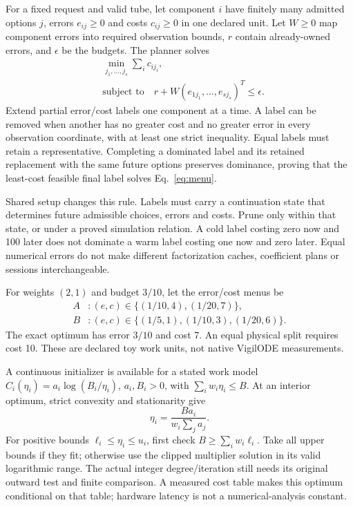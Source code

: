 \documentclass[aps,pra,reprint,onecolumn,10pt,notitlepage,nofootinbib]{revtex4-2}
\begin{document}
For a fixed request and valid tube, let component $i$ have finitely many
admitted options $j$, errors $e_{ij}\ge0$ and costs $c_{ij}\ge0$ in one
declared unit. Let $W\ge0$ map component errors into required observation
bounds, $r$ contain already-owned errors, and $\epsilon$ be the budgets.
The planner solves
\begin{equation}
 \begin{aligned}
 &\min_{j_1,\ldots,j_s}\sum_i c_{ij_i},\\
 &\text{subject to}\quad
 r+W(e_{1j_1},\ldots,e_{sj_s})^T\le\epsilon.
 \end{aligned}                                             \label{eq:menu}
\end{equation}
Extend partial error/cost labels one component at a time. A label can be
removed when another has no greater cost and no greater error in every
observation coordinate, with at least one strict inequality. Equal labels
must retain a representative. Completing a dominated label and its retained
replacement with the same future options preserves dominance, proving that
the least-cost feasible final label solves Eq.~\eqref{eq:menu}.

Shared setup changes this rule. Labels must carry a continuation state that
determines future admissible choices, errors and costs. Prune only within
that state, or under a proved simulation relation. A cold label costing zero
now and 100 later does not dominate a warm label costing one now and zero
later. Equal numerical errors do not make different factorization caches,
coefficient plans or sessions interchangeable.

For weights $(2,1)$ and budget $3/10$, let the error/cost menus be
\[
 \begin{aligned}
 A &: (e,c)\in\{(1/10,4),(1/20,7)\},\\
 B &: (e,c)\in\{(1/5,1),(1/10,3),(1/20,6)\}.
 \end{aligned}
\]
The exact optimum has error $3/10$ and cost 7.
An equal physical split requires cost 10. These are declared toy work units,
not native VigilODE measurements.

A continuous initializer is available for a stated work model
$C_i(\eta_i)=a_i\log(B_i/\eta_i)$, $a_i,B_i>0$, with
$\sum_iw_i\eta_i\le B$. At an interior optimum, strict convexity and
stationarity give
\begin{equation}
 \eta_i=\frac{Ba_i}{w_i\sum_j a_j}.                          \label{eq:kkt}
\end{equation}
For positive bounds $\ell_i\le\eta_i\le u_i$, first check
$B\ge\sum_iw_i\ell_i$. Take all upper bounds if they fit; otherwise use the
clipped multiplier solution in its valid logarithmic range. The actual
integer degree/iteration still needs its original outward test and finite
comparison. A measured cost table makes this optimum conditional on that
table; hardware latency is not a numerical-analysis constant.
\end{document}
